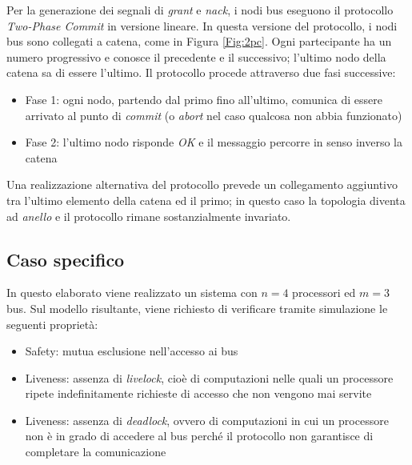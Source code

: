 Per la generazione dei segnali di \textit{grant} e \textit{nack}, i nodi bus eseguono il protocollo \textit{Two-Phase Commit} in versione lineare. In questa versione del protocollo, i nodi bus sono collegati a catena, come in Figura \ref{Fig:2pc}. Ogni partecipante ha un numero progressivo e conosce il precedente e il successivo; l'ultimo nodo della catena sa di essere l'ultimo. Il protocollo procede attraverso due fasi successive:
\begin{itemize}
\item Fase 1: ogni nodo, partendo dal primo fino all'ultimo, comunica di essere arrivato al punto di \textit{commit} (o \textit{abort} nel caso qualcosa non abbia funzionato)
\item Fase 2: l'ultimo nodo risponde \textit{OK} e il messaggio percorre in senso inverso la catena
\end{itemize}
Una realizzazione alternativa del protocollo prevede un collegamento aggiuntivo tra l'ultimo elemento della catena ed il primo; in questo caso la topologia diventa ad \textit{anello} e il protocollo rimane sostanzialmente invariato.
\subsection{Caso specifico}
In questo elaborato viene realizzato un sistema con $n=4$ processori ed $m=3$ bus. Sul modello risultante, viene richiesto di verificare tramite simulazione le seguenti proprietà:
\begin{itemize}
\item Safety: mutua esclusione nell'accesso ai bus
\item Liveness: assenza di \textit{livelock}, cioè di computazioni nelle quali un processore ripete indefinitamente richieste di accesso che non vengono mai servite
\item Liveness: assenza di \textit{deadlock}, ovvero di computazioni in cui un processore non è in grado di accedere al bus perché il protocollo non garantisce di completare la comunicazione
\end{itemize}
